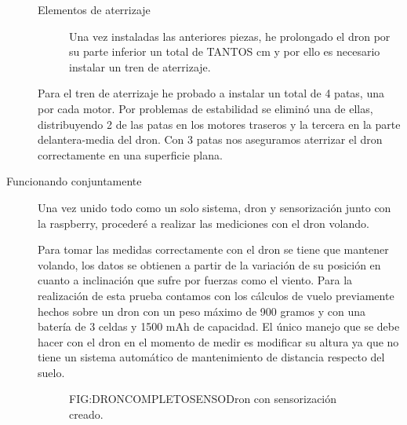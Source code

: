 \begin{description}
\begin{description}
\item[Elementos de aterrizaje]

Una vez instaladas las anteriores piezas, he prolongado el dron por su parte inferior un total de TANTOS cm y por ello es necesario instalar un tren de aterrizaje.

\end{description}

Para el tren de aterrizaje he probado a instalar un total de 4 patas, una por cada motor. Por problemas de estabilidad se eliminó una de ellas, distribuyendo 2 de las patas en los motores traseros y la tercera en la parte delantera-media del dron. Con 3 patas nos aseguramos aterrizar el dron correctamente en una superficie plana.

\item[Funcionando conjuntamente]

Una vez unido todo como un solo sistema, dron y sensorización junto con la raspberry, procederé a realizar las mediciones con el dron volando.

Para tomar las medidas correctamente con el dron se tiene que mantener volando, los datos se obtienen a partir de la variación de su posición en cuanto a inclinación que sufre por fuerzas como el viento.
Para la realización de esta prueba contamos con los cálculos de vuelo previamente hechos sobre un dron con un peso máximo de 900 gramos y con una batería de 3 celdas y 1500 mAh de capacidad. El único manejo que se debe hacer con el dron en el momento de medir es modificar su altura ya que no tiene un sistema automático de mantenimiento de distancia respecto del suelo.

  \begin{figure}[Foto del dron con sensorización de viento]{FIG:DRONCOMPLETOSENSO}{Dron con sensorización creado.}
\end{figure}


\end{description}

